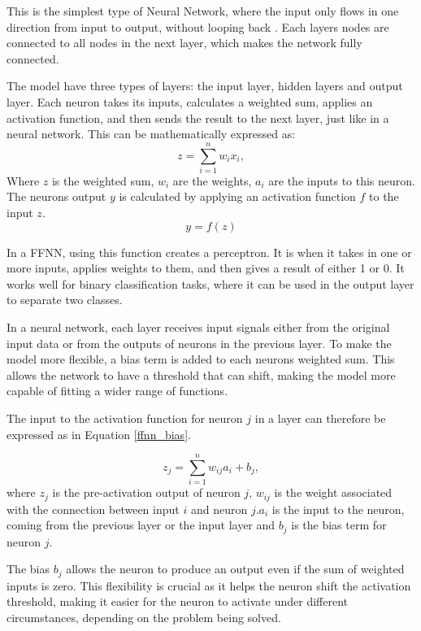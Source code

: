 \documentclass{article}
\newcommand{\0}{\mathbf{0}}
\newcommand{\1}{\mathbf{1}}
\begin{document}
This is the simplest type of Neural Network, where the input only flows in one direction from input to output, without looping back \cite{neuralnetworks_MH}. Each layers nodes are connected to all nodes in the next layer, which makes the network fully connected. 

The model have three types of layers: the input layer, hidden layers and output layer. Each neuron takes its inputs, calculates a weighted sum, applies an activation function, and then sends the result to the next layer, just like in a neural network. This can be mathematically expressed as: 
\begin{equation}
    z = \sum_{i=1}^{n} w_i x_i, 
\end{equation}
Where \( z \) is the weighted sum, \( w_i \) are the weights, \( a_i \) are the inputs to this neuron.
The neurons output \( y \) is calculated by applying an activation function \( f\) to the input \( z \). 
\begin{equation}
    y = f(z)
\end{equation}

In a FFNN, using this function creates a perceptron. It is when it takes in one or more inputs, applies weights to them, and then gives a result of either 1 or 0. It works well for binary classification tasks, where it can be used in the output layer to separate two classes.

In a neural network, each layer receives input signals either from the original input data or from the outputs of neurons in the previous layer. To make the model more flexible, a bias term is added to each neurons weighted sum. This allows the network to have a threshold that can shift, making the model more capable of fitting a wider range of functions.

The input to the activation function for neuron \( j \) in a layer can therefore be expressed as in Equation \ref{ffnn_bias}.

\begin{equation}
    z_j = \sum_{i=1}^{n} w_{ij} a_i + b_j,
    \label{ffnn_bias}
\end{equation}
where \( z_j \) is the pre-activation output of neuron \( j \), \( w_{ij} \) is the weight associated with the connection between input \( i \) and neuron \( j \).\( a_i \) is the input to the neuron, coming from the previous layer or the input layer and \( b_j \) is the bias term for neuron \( j \).

The bias \( b_j \) allows the neuron to produce an output even if the sum of weighted inputs is zero. This flexibility is crucial as it helps the neuron shift the activation threshold, making it easier for the neuron to activate under different circumstances, depending on the problem being solved.
\end{document}
